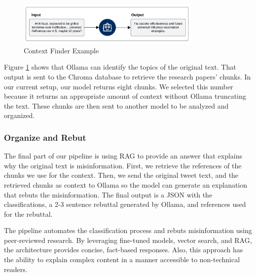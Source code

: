 \begin{figure}[!htb]
	\begin{center}
		\includegraphics[width=0.8\textwidth]{figures/Context_finder_process.png}
	\end{center}
	\caption{Context Finder Example} 
	\label{fig:cfe}
\end{figure}

\indent Figure \ref{fig:cfe} shows that Ollama can identify the topics of the original text. That output is sent to the Chroma database to retrieve the research papers' chunks. In our current setup, our model returns eight chunks. We selected
this number because it returns an appropriate amount of context without Ollama truncating the text. These chunks are then sent to another model to be analyzed and organized.

\subsubsection{Organize and Rebut}
The final part of our pipeline is using RAG to provide an answer that explains why the original text is misinformation. First, we retrieve the references of the chunks we use for the context. Then, we send the original tweet text, and the retrieved chunks  as context to Ollama so the model can generate an explanation that rebuts the misinformation. The final output is a JSON with the classifications, a 2-3 sentence rebuttal generated by Ollama, and references used for the rebuttal.

The pipeline automates the classification process and rebuts misinformation using peer-reviewed research. By leveraging fine-tuned models, vector search, and RAG, the architecture provides concise, fact-based responses. Also, this
approach has the ability to explain complex content in a manner accessible to non-technical readers. 


